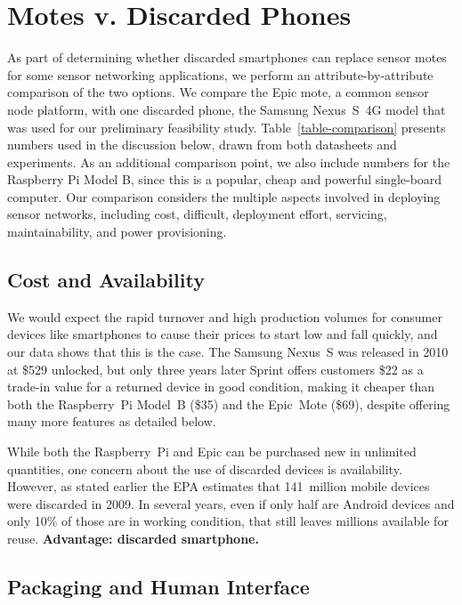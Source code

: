 \section{Motes v. Discarded Phones}
\label{sec-comparison}



As part of determining whether discarded smartphones can replace sensor motes
for some sensor networking applications, we perform an attribute-by-attribute
comparison of the two options. We compare the Epic mote, a common sensor node
platform, with one discarded phone, the Samsung Nexus~S~4G  model that was
used for our preliminary feasibility study. Table~\ref{table-comparison}
presents numbers used in the discussion below, drawn from both datasheets and
experiments. As an additional comparison point, we also include numbers for
the Raspberry Pi Model B, since this is a popular, cheap and powerful
single-board computer. Our comparison considers the multiple aspects involved
in deploying sensor networks, including cost, difficult, deployment effort,
servicing, maintainability, and power provisioning.

\subsection{Cost and Availability}

We would expect the rapid turnover and high production volumes for consumer
devices like smartphones to cause their prices to start low and fall quickly,
and our data shows that this is the case. The Samsung Nexus~S was released in
2010 at \$529 unlocked, but only three years later Sprint offers customers
\$22 as a trade-in value for a returned device in good condition, making it
cheaper than both the Raspberry~Pi Model~B (\$35) and the Epic~Mote (\$69),
despite offering many more features as detailed below.

While both the Raspberry~Pi and Epic can be purchased new in unlimited
quantities, one concern about the use of discarded devices is availability.
However, as stated earlier the EPA estimates that 141~million mobile devices
were discarded in 2009. In several years, even if only half are Android
devices and only 10\% of those are in working condition, that still leaves
millions available for reuse. \textbf{Advantage: discarded smartphone.}

\subsection{Packaging and Human Interface}

